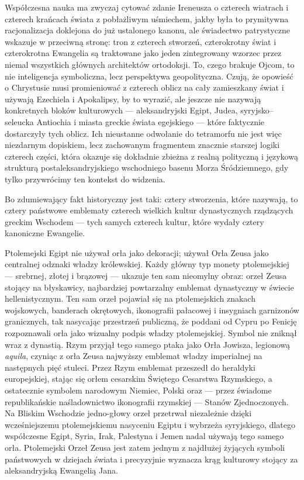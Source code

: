 Współczesna nauka ma zwyczaj cytować zdanie Ireneusza o czterech wiatrach i czterech krańcach świata z pobłażliwym uśmiechem, jakby była to prymitywna racjonalizacja doklejona do już ustalonego kanonu, ale świadectwo patrystyczne wskazuje w przeciwną stronę: tron z czterech stworzeń, czterokrotny świat i czterokrotna Ewangelia są traktowane jako jeden zintegrowany wzorzec przez niemal wszystkich głównych architektów ortodoksji.
To, czego brakuje Ojcom, to nie inteligencja symboliczna, lecz perspektywa geopolityczna.
Czują, że opowieść o Chrystusie musi promieniować z czterech oblicz na cały zamieszkany świat i używają Ezechiela i Apokalipsy, by to wyrazić, ale jeszcze nie nazywają konkretnych bloków kulturowych — aleksandryjski Egipt, Judea, syryjsko–seleucka Antiochia i miasta greckie świata egejskiego — które faktycznie dostarczyły tych oblicz.
Ich nieustanne odwołanie do tetramorfu nie jest więc niezdarnym dopiskiem, lecz zachowanym fragmentem znacznie starszej logiki czterech części, która okazuje się dokładnie zbieżna z realną polityczną i językową strukturą postaleksandryjskiego wschodniego basenu Morza Śródziemnego, gdy tylko przywrócimy ten kontekst do widzenia.

Bo zdumiewający fakt historyczny jest taki: cztery stworzenia, które nazywają, to cztery państwowe emblematy czterech wielkich kultur dynastycznych rządzących greckim Wschodem — tych samych czterech kultur, które wydały cztery kanoniczne Ewangelie.

Ptolemejski Egipt nie używał orła jako dekoracji; używał Orła Zeusa jako centralnej odznaki władzy królewskiej.
Każdy główny typ monety ptolemejskiej — srebrnej, złotej i brązowej — ukazuje ten sam nieomylny obraz: orzeł Zeusa stojący na błyskawicy, najbardziej powtarzalny emblemat dynastyczny w świecie hellenistycznym.
Ten sam orzeł pojawiał się na ptolemejskich znakach wojskowych, banderach okrętowych, ikonografii pałacowej i insygniach garnizonów granicznych, tak nasycając przestrzeń publiczną, że poddani od Cypru po Fenicję rozpoznawali orła jako wizualny podpis władzy ptolemejskiej.
Symbol nie zniknął wraz z dynastią.
Rzym przyjął tego samego ptaka jako Orła Jowisza, legionową \textit{aquila}, czyniąc z orła Zeusa najwyższy emblemat władzy imperialnej na następnych pięć stuleci.
Przez Rzym emblemat przeszedł do heraldyki europejskiej, stając się orłem cesarskim Świętego Cesarstwa Rzymskiego, a ostatecznie symbolem narodowym Niemiec, Polski oraz — przez świadome republikańskie naśladownictwo ikonografii rzymskiej — Stanów Zjednoczonych.
Na Bliskim Wschodzie jedno-głowy orzeł przetrwał niezależnie dzięki wcześniejszemu ptolemejskiemu nasyceniu Egiptu i wybrzeża syryjskiego, dlatego współczesne Egipt, Syria, Irak, Palestyna i Jemen nadal używają tego samego orła.
Ptolemejski Orzeł Zeusa jest zatem jednym z najdłużej żyjących symboli państwowych w dziejach świata i precyzyjnie wyznacza krąg kulturowy stojący za aleksandryjską Ewangelią Jana.

